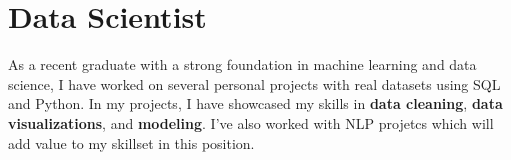 
\section{Data Scientist}
\small{
    As a recent graduate with a strong foundation in machine learning and data science, I have worked on several personal projects with real datasets using SQL and Python. In my projects, I have showcased my skills in \textbf{data cleaning}, \textbf{data visualizations}, and \textbf{modeling}. I've also worked with NLP projetcs which will add value to my skillset in this position.
}
